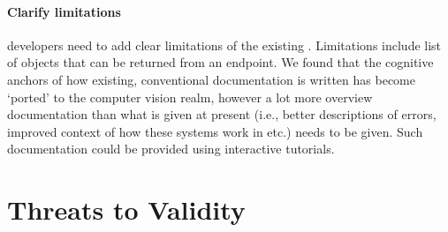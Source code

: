 \paragraph{Clarify limitations}  developers need to add clear limitations of the existing . Limitations include list of objects that can be returned from an endpoint.  We found that the cognitive anchors of how existing, conventional  documentation is written has become `ported' to the computer vision realm, however a lot more overview documentation than what is given at present (i.e., better descriptions of errors, improved context of how these systems work in etc.) needs to be given.
Such documentation could be provided using interactive tutorials.

%


%
%
%
%
%




\section{Threats to Validity}
\label{icse2020:sec:limitations}

%
